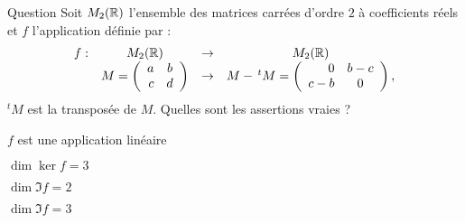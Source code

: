 \begin{multi}[multiple,feedback=
{On vérifie que \(f\) est une application linéaire, \(\ker f=\left\{ \left(\begin{array}{rc}
a&b\\b&d\\ \end{array}\right) \; ; \; a,b,d \in \Rr \right \}\) et  
\(\Im f = \left\{ \left(\begin{array}{rc}0&\alpha\\-\alpha&0\\ 
\end{array}\right) \; ; \; \alpha \in \Rr  \right \}\). On  déduit que  \(\dim \ker f=3\) et \(\dim \Im f = 1\).
}]{Question}
Soit \( M_2(\mathbb{R})\) l'ensemble des matrices carrées d'ordre \(2\) à coefficients réels et 
\(f\) l'application  définie par :
\[\begin{array}{rccc}f:&M_2(\mathbb{R})&\to& M_2(\mathbb{R})\\
& M = \left(\begin{array}{rc}
a&b\\c&d\\ \end{array}\right) &\to &M- \, ^t M = 
\left(\begin{array}{rc}0&b-c\\c-b&0\\ 
\end{array}\right),  \end{array}\]
\(^tM\) est la transposée de \(M\). Quelles sont les assertions vraies ?

    \item* \(f\) est une application linéaire
    \item* \(\dim \ker f = 3\)
    \item \(\dim \Im f = 2\)
    \item \(\dim \Im f = 3\)
\end{multi}


